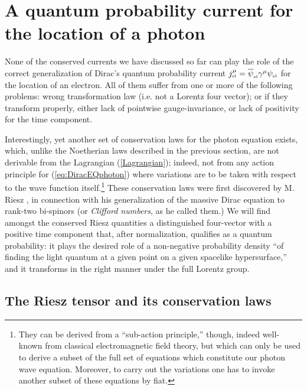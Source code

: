 \documentclass[12pt]{article}
\theoremstyle{definition}
\newcommand{\refeq}[1]{(\ref{#1})}
\numberwithin{equation}{section}
\newcommand{\psiEL}{{\psi_{\mbox{\rm\tiny el}}}}
\newcommand{\psiELb}{{\overline\psi_{\mbox{\rm\tiny el}}}}
\newcommand{\ga}{\gamma}
\begin{document}
\section{A quantum probability current for the location of a photon}\label{sec:riesz}

  None of the conserved currents we have discussed so far can play the role of 
the correct generalization of Dirac's quantum probability current $j_{\mbox{\tiny el}}^\mu = \psiELb\ga^\mu \psiEL$ for the 
location of an electron.
  All of them suffer from one or more of the following problems: wrong transformation law 
(i.e. not a Lorentz four vector); or if they transform properly, either lack of pointwise gauge-invariance, 
or lack of positivity for the time component. 

  Interestingly, yet another set of conservation laws for the photon equation exists, which, unlike the Noetherian laws described in the 
previous section, are not derivable from the Lagrangian \refeq{Lagrangian}; indeed, not from any action principle for \refeq{eq:DiracEQphoton}
where variations are to be taken with respect to the wave function itself.\footnote{They can be derived from a ``sub-action principle,'' though,
 indeed well-known from classical electromagnetic field theory, but which can only be used to derive a subset of the full set of equations which
 constitute our photon wave equation. 
 Moreover, to carry out the variations one has to invoke another subset of these equations by fiat.}
 These conservation laws were first discovered by M. Riesz \cite{Rie1946}, in connection with his generalization 
of the massive Dirac equation to rank-two bi-spinors (or {\em Clifford numbers}, as he called them.)
 We will find amongst the conserved Riesz quantities a distinguished four-vector with a positive time component
that, after normalization, qualifies as a quantum probability:
 it plays the desired role of a non-negative probability density ``of finding the light quantum at a given point on a 
given spacelike hypersurface,'' and it transforms in the right manner under the full Lorentz group.

\subsection{The Riesz tensor and its conservation laws}
\end{document}
